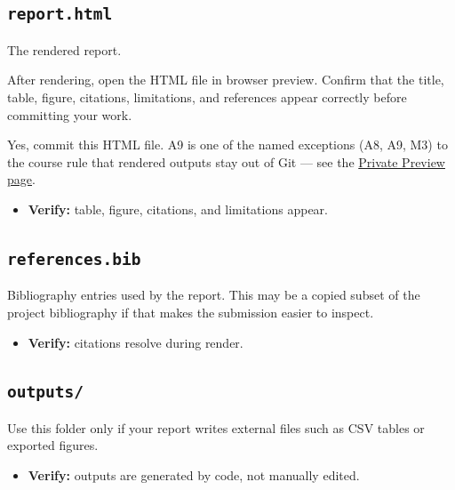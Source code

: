 \documentclass[
  letterpaper,
  DIV=11,
  numbers=noendperiod,
  oneside]{scrreprt}
\providecommand{\tightlist}{%
  \setlength{\itemsep}{0pt}\setlength{\parskip}{0pt}}
\begin{document}
\subsection*{\texorpdfstring{\texttt{report.html}}{report.html}}\label{report.html}

The rendered report.

After rendering, open the HTML file in browser preview. Confirm that the
title, table, figure, citations, limitations, and references appear
correctly before committing your work.

Yes, commit this HTML file. A9 is one of the named exceptions (A8, A9,
M3) to the course rule that rendered outputs stay out of Git --- see the
\hyperref[private-preview]{Private Preview page}.

\begin{itemize}
\tightlist
\item
  \textbf{Verify:} table, figure, citations, and limitations appear.
\end{itemize}

\subsection*{\texorpdfstring{\texttt{references.bib}}{references.bib}}\label{references.bib}

Bibliography entries used by the report. This may be a copied subset of
the project bibliography if that makes the submission easier to inspect.

\begin{itemize}
\tightlist
\item
  \textbf{Verify:} citations resolve during render.
\end{itemize}

\subsection*{\texorpdfstring{\texttt{outputs/}}{outputs/}}\label{outputs}

Use this folder only if your report writes external files such as CSV
tables or exported figures.

\begin{itemize}
\tightlist
\item
  \textbf{Verify:} outputs are generated by code, not manually edited.
\end{itemize}
\end{document}
